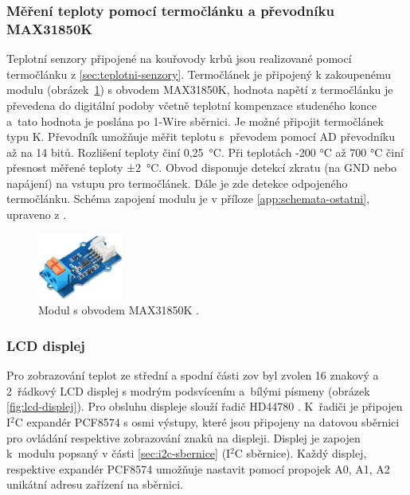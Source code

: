 \subsubsection{Měření teploty pomocí termočlánku a převodníku MAX31850K}
Teplotní senzory připojené na kouřovody krbů jsou realizované pomocí termočlánku z \ref{sec:teplotni-senzory}. Termočlánek je připojený k zakoupenému modulu (obrázek~\ref{fig:modul-max31850k-1-wire-prevodnik-termoclanku}) s obvodem MAX31850K, hodnota napětí z termočlánku je převedena do digitální podoby včetně teplotní kompenzace studeného konce a~tato hodnota je poslána po 1-Wire sběrnici. Je možné připojit termočlánek typu K. Převodník umožňuje měřit teplotu s~převodem pomocí AD převodníku až na 14 bitů. Rozlišení teploty činí 0,25~°C. Při teplotách -200 °C až 700 °C činí přesnost měřené teploty ±2~°C. Obvod disponuje detekcí zkratu (na GND nebo napájení) na vstupu pro termočlánek. Dále je zde detekce odpojeného termočlánku. Schéma zapojení modulu je v příloze \ref{app:schemata-ostatni}, upraveno z \cite{prevodnik-max31850k}.

\begin{figure}[H]
    \centering
    \includegraphics[width=0.25\textwidth]{images/krb/modul-max31850k-1-wire-prevodnik-termoclanku.png}
    \caption[Modul s obvodem MAX31850K.]{Modul s obvodem MAX31850K \cite{prevodnik-max31850k}.}
    \label{fig:modul-max31850k-1-wire-prevodnik-termoclanku}
\end{figure}

\subsubsection{LCD displej}
Pro zobrazování teplot ze střední a spodní části \acrshort{zov} byl zvolen 16 znakový a 2~řádkový LCD displej s modrým podsvícením a~bílými písmeny (obrázek \ref{fig:lcd-displej}). Pro obsluhu displeje slouží řadič HD44780 \cite{hd44780u}. K~řadiči je připojen I$^2$C expandér PCF8574 \cite{pcf8574} s osmi výstupy, které jsou připojeny na datovou sběrnici pro ovládání respektive zobrazování znaků na displeji. Displej je zapojen k~modulu popsaný v části \ref{sec:i2c-sbernice} (I$^2$C sběrnice). Každý displej, respektive expandér PCF8574  umožňuje nastavit pomocí propojek A0, A1, A2 unikátní adresu zařízení na sběrnici.


